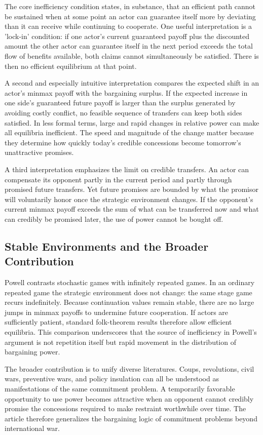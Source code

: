 The core inefficiency condition states, in substance, that an efficient path cannot be sustained when at some point an actor can guarantee itself more by deviating than it can receive while continuing to cooperate. One useful interpretation is a 'lock-in' condition: if one actor's current guaranteed payoff plus the discounted amount the other actor can guarantee itself in the next period exceeds the total flow of benefits available, both claims cannot simultaneously be satisfied. There is then no efficient equilibrium at that point.

A second and especially intuitive interpretation compares the expected shift in an actor's minmax payoff with the bargaining surplus. If the expected increase in one side's guaranteed future payoff is larger than the surplus generated by avoiding costly conflict, no feasible sequence of transfers can keep both sides satisfied. In less formal terms, large and rapid changes in relative power can make all equilibria inefficient. The speed and magnitude of the change matter because they determine how quickly today's credible concessions become tomorrow's unattractive promises.

A third interpretation emphasizes the limit on credible transfers. An actor can compensate its opponent partly in the current period and partly through promised future transfers. Yet future promises are bounded by what the promisor will voluntarily honor once the strategic environment changes. If the opponent's current minmax payoff exceeds the sum of what can be transferred now and what can credibly be promised later, the use of power cannot be bought off.

\subsection{Stable Environments and the Broader Contribution}

Powell contrasts stochastic games with infinitely repeated games. In an ordinary repeated game the strategic environment does not change: the same stage game recurs indefinitely. Because continuation values remain stable, there are no large jumps in minmax payoffs to undermine future cooperation. If actors are sufficiently patient, standard folk-theorem results therefore allow efficient equilibria. This comparison underscores that the source of inefficiency in Powell's argument is not repetition itself but rapid movement in the distribution of bargaining power.

The broader contribution is to unify diverse literatures. Coups, revolutions, civil wars, preventive wars, and policy insulation can all be understood as manifestations of the same commitment problem. A temporarily favorable opportunity to use power becomes attractive when an opponent cannot credibly promise the concessions required to make restraint worthwhile over time. The article therefore generalizes the bargaining logic of commitment problems beyond international war.

